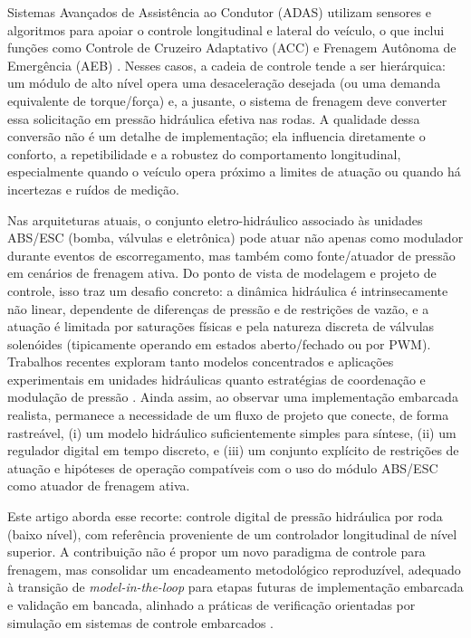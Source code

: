 \documentclass[a4paper]{ifacconf}
\begin{document}
Sistemas Avançados de Assistência ao Condutor (ADAS) utilizam sensores e algoritmos para apoiar o controle longitudinal e lateral do veículo, o que inclui funções como Controle de Cruzeiro Adaptativo (ACC) e Frenagem Autônoma de Emergência (AEB) \cite{Lentin2022}. Nesses casos, a cadeia de controle tende a ser hierárquica: um módulo de alto nível opera uma desaceleração desejada (ou uma demanda equivalente de torque/força) e, a jusante, o sistema de frenagem deve converter essa solicitação em pressão hidráulica efetiva nas rodas. A qualidade dessa conversão não é um detalhe de implementação; ela influencia diretamente o conforto, a repetibilidade e a robustez do comportamento longitudinal, especialmente quando o veículo opera próximo a limites de atuação ou quando há incertezas e ruídos de medição.

Nas arquiteturas atuais, o conjunto eletro-hidráulico associado às unidades ABS/ESC (bomba, válvulas e eletrônica) pode atuar não apenas como modulador durante eventos de escorregamento, mas também como fonte/atuador de pressão em cenários de frenagem ativa. Do ponto de vista de modelagem e projeto de controle, isso traz um desafio concreto: a dinâmica hidráulica é intrinsecamente não linear, dependente de diferenças de pressão e de restrições de vazão, e a atuação é limitada por saturações físicas e pela natureza discreta de válvulas solenóides (tipicamente operando em estados aberto/fechado ou por PWM). Trabalhos recentes exploram tanto modelos concentrados e aplicações experimentais em unidades hidráulicas \cite{HouhuaJing2022,ZengYangHuang2023} quanto estratégias de coordenação e modulação de pressão \cite{Lv2014,ChenLv2017,PressureCoordinatedControl2023}. Ainda assim, ao observar uma implementação embarcada realista, permanece a necessidade de um fluxo de projeto que conecte, de forma rastreável, (i) um modelo hidráulico suficientemente simples para síntese, (ii) um regulador digital em tempo discreto, e (iii) um conjunto explícito de restrições de atuação e hipóteses de operação compatíveis com o uso do módulo ABS/ESC como atuador de frenagem ativa.

Este artigo aborda esse recorte: controle digital de pressão hidráulica por roda (baixo nível), com referência proveniente de um controlador longitudinal de nível superior. A contribuição não é propor um novo paradigma de controle para frenagem, mas consolidar um encadeamento metodológico reproduzível, adequado à transição de \textit{model-in-the-loop} para etapas futuras de implementação embarcada e validação em bancada, alinhado a práticas de verificação orientadas por simulação em sistemas de controle embarcados \cite{KapinskiJamesDeshmukh2016}.
\end{document}

